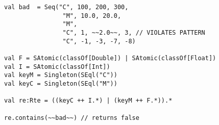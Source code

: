 \begin{lstlisting}[style=scalaioScala]
val bad  = Seq("C", 100, 200, 300,
                "M", 10.0, 20.0,
                "M",
                "C", 1, ~~2.0~~, 3, // VIOLATES PATTERN
                "C", -1, -3, -7, -8)

val F = SAtomic(classOf[Double]) | SAtomic(classOf[Float])
val I = SAtomic(classOf[Int])
val keyM = Singleton(SEql("C"))
val keyC = Singleton(SEql("M"))

val re:Rte = ((keyC ++ I.*) | (keyM ++ F.*)).*

re.contains(~~bad~~) // returns false
\end{lstlisting}
